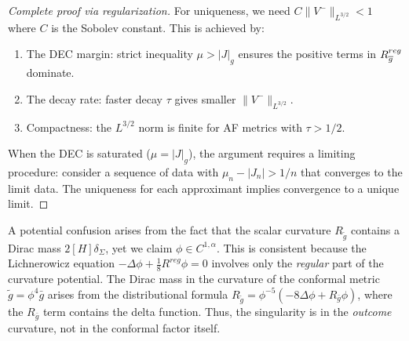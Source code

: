 \begin{proof}[Complete proof via regularization]
For uniqueness, we need $C \|V^-\|_{L^{3/2}} < 1$ where $C$ is the Sobolev constant. This is achieved by:
\begin{enumerate}
    \item The DEC margin: strict inequality $\mu > |J|_g$ ensures the positive terms in $R_{\overline{g}}^{reg}$ dominate.
    \item The decay rate: faster decay $\tau$ gives smaller $\|V^-\|_{L^{3/2}}$.
    \item Compactness: the $L^{3/2}$ norm is finite for AF metrics with $\tau > 1/2$.
\end{enumerate}

When the DEC is saturated ($\mu = |J|_g$), the argument requires a limiting procedure: consider a sequence of data with $\mu_n - |J_n| > 1/n$ that converges to the limit data. The uniqueness for each approximant implies convergence to a unique limit.
\end{proof}

\begin{remark}
A potential confusion arises from the fact that the scalar curvature $R_{\tilde{g}}$ contains a Dirac mass $2[H]\delta_\Sigma$, yet we claim $\phi \in C^{1,\alpha}$. This is consistent because the Lichnerowicz equation $-\Delta \phi + \frac{1}{8}R^{reg}\phi = 0$ involves only the \emph{regular} part of the curvature potential. The Dirac mass in the curvature of the conformal metric $\tilde{g} = \phi^4 \bar{g}$ arises from the distributional formula $R_{\tilde{g}} = \phi^{-5}(-8\Delta \phi + R_{\bar{g}}\phi)$, where the $R_{\bar{g}}$ term contains the delta function. Thus, the singularity is in the \emph{outcome} curvature, not in the conformal factor itself.
\end{remark}


